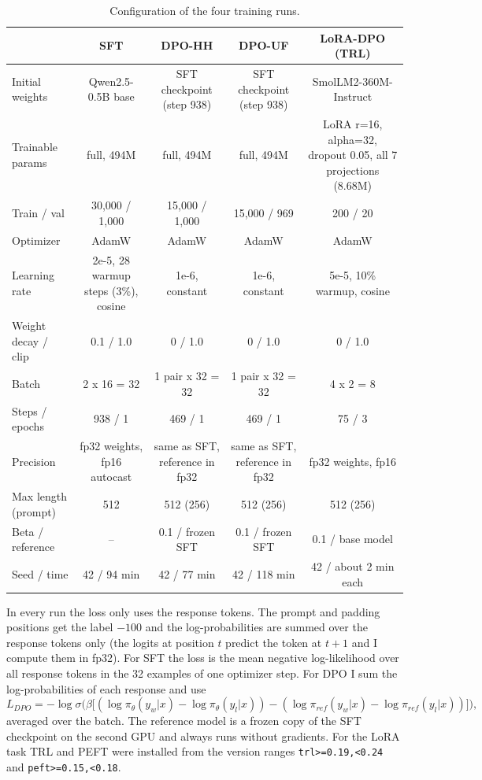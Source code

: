 \documentclass[11pt,a4paper]{article}
\begin{document}
\begin{table}[!htbp]
\centering
\small
\begin{tabularx}{\linewidth}{|>{\centering\arraybackslash}m{2.6cm}|*{4}{C|}}
\hline
 & SFT & DPO-HH & DPO-UF & LoRA-DPO (TRL) \\ \hline
Initial weights & Qwen2.5-0.5B base & SFT checkpoint (step 938) & SFT checkpoint (step 938) & SmolLM2-360M-Instruct \\ \hline
Trainable params & full, 494M & full, 494M & full, 494M & LoRA r=16, alpha=32, dropout 0.05, all 7 projections (8.68M) \\ \hline
Train / val & 30,000 / 1,000 & 15,000 / 1,000 & 15,000 / 969 & 200 / 20 \\ \hline
Optimizer & AdamW & AdamW & AdamW & AdamW \\ \hline
Learning rate & 2e-5, 28 warmup steps (3\%), cosine & 1e-6, constant & 1e-6, constant & 5e-5, 10\% warmup, cosine \\ \hline
Weight decay / clip & 0.1 / 1.0 & 0 / 1.0 & 0 / 1.0 & 0 / 1.0 \\ \hline
Batch & 2 x 16 = 32 & 1 pair x 32 = 32 & 1 pair x 32 = 32 & 4 x 2 = 8 \\ \hline
Steps / epochs & 938 / 1 & 469 / 1 & 469 / 1 & 75 / 3 \\ \hline
Precision & fp32 weights, fp16 autocast & same as SFT, reference in fp32 & same as SFT, reference in fp32 & fp32 weights, fp16 \\ \hline
Max length (prompt) & 512 & 512 (256) & 512 (256) & 512 (256) \\ \hline
Beta / reference & -- & 0.1 / frozen SFT & 0.1 / frozen SFT & 0.1 / base model \\ \hline
Seed / time & 42 / 94 min & 42 / 77 min & 42 / 118 min & 42 / about 2 min each \\ \hline
\end{tabularx}
\caption{Configuration of the four training runs.}
\label{tab:config}
\end{table}

In every run the loss only uses the response tokens. The prompt and padding positions get the label $-100$ and the log-probabilities are
summed over the response tokens only (the logits at position $t$ predict the token at $t+1$ and I compute them in fp32). For SFT the loss is the
mean negative log-likelihood over all response tokens in the 32 examples of one optimizer step. For DPO I sum the log-probabilities of each
response and use
\[
L_{DPO} = -\log \sigma\Big(\beta\big[(\log \pi_\theta(y_w|x) - \log \pi_\theta(y_l|x)) - (\log \pi_{ref}(y_w|x) - \log \pi_{ref}(y_l|x))\big]\Big),
\]
averaged over the batch. The reference model is a frozen copy of the SFT checkpoint on the second GPU and always runs without gradients.
For the LoRA task TRL and PEFT were installed from the version ranges \texttt{trl>=0.19,<0.24} and \texttt{peft>=0.15,<0.18}.
\end{document}
